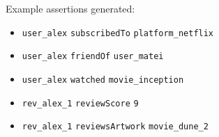 \vspace{0.3cm}
\noindent Example assertions generated:
\begin{itemize}
    \item \texttt{user\_alex} \texttt{subscribedTo} \texttt{platform\_netflix}
    \item \texttt{user\_alex} \texttt{friendOf} \texttt{user\_matei}
    \item \texttt{user\_alex} \texttt{watched} \texttt{movie\_inception}
    \item \texttt{rev\_alex\_1} \texttt{reviewScore} \texttt{9}
    \item \texttt{rev\_alex\_1} \texttt{reviewsArtwork} \texttt{movie\_dune\_2}
\end{itemize}